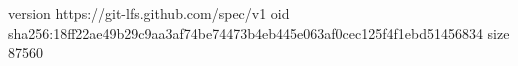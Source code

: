 version https://git-lfs.github.com/spec/v1
oid sha256:18ff22ae49b29c9aa3af74be74473b4eb445e063af0cec125f4f1ebd51456834
size 87560
